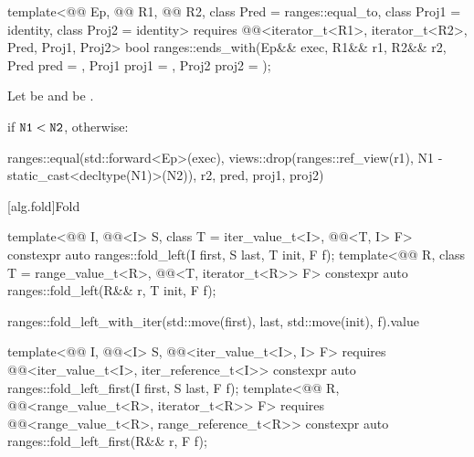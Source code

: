 \begin{itemdecl}
template<@@ Ep, @@ R1,
         @@ R2, class Pred = ranges::equal_to,
         class Proj1 = identity, class Proj2 = identity>
  requires @@<iterator_t<R1>, iterator_t<R2>, Pred, Proj1, Proj2>
  bool ranges::ends_with(Ep&& exec, R1&& r1, R2&& r2,
                         Pred pred = {}, Proj1 proj1 = {}, Proj2 proj2 = {});
\end{itemdecl}

\begin{itemdescr}
\pnum
Let  be  and
 be .

\pnum
\returns
{} if $\tcode{N1} < \tcode{N2}$, otherwise:
\begin{codeblock}
ranges::equal(std::forward<Ep>(exec),
              views::drop(ranges::ref_view(r1), N1 - static_cast<decltype(N1)>(N2)),
              r2, pred, proj1, proj2)
\end{codeblock}
\end{itemdescr}

[alg.fold]{Fold}

%
\begin{itemdecl}
template<@@ I, @@<I> S, class T = iter_value_t<I>,
         @@<T, I> F>
  constexpr auto ranges::fold_left(I first, S last, T init, F f);
template<@@ R, class T = range_value_t<R>,
         @@<T, iterator_t<R>> F>
  constexpr auto ranges::fold_left(R&& r, T init, F f);
\end{itemdecl}

\begin{itemdescr}
\pnum
\returns
\begin{codeblock}
ranges::fold_left_with_iter(std::move(first), last, std::move(init), f).value
\end{codeblock}
\end{itemdescr}

%
\begin{itemdecl}
template<@@ I, @@<I> S,
         @@<iter_value_t<I>, I> F>
  requires @@<iter_value_t<I>, iter_reference_t<I>>
  constexpr auto ranges::fold_left_first(I first, S last, F f);
template<@@ R, @@<range_value_t<R>, iterator_t<R>> F>
  requires @@<range_value_t<R>, range_reference_t<R>>
  constexpr auto ranges::fold_left_first(R&& r, F f);
\end{itemdecl}

